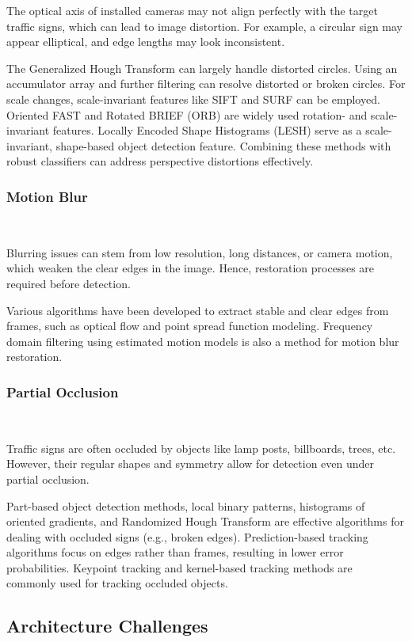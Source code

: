\documentclass[letterpaper, 10 pt, conference]{ieeeconf}
\begin{document}
The optical axis of installed cameras may not align perfectly with the target traffic signs, which can lead to image distortion. For example, a circular sign may appear elliptical, and edge lengths may look inconsistent.

The Generalized Hough Transform can largely handle distorted circles. Using an accumulator array and further filtering can resolve distorted or broken circles. For scale changes, scale-invariant features like SIFT and SURF can be employed. Oriented FAST and Rotated BRIEF (ORB) are widely used rotation- and scale-invariant features. Locally Encoded Shape Histograms (LESH) serve as a scale-invariant, shape-based object detection feature. Combining these methods with robust classifiers can address perspective distortions effectively.

\subsubsection{Motion Blur}\

Blurring issues can stem from low resolution, long distances, or camera motion, which weaken the clear edges in the image. Hence, restoration processes are required before detection.

Various algorithms have been developed to extract stable and clear edges from frames, such as optical flow and point spread function modeling. Frequency domain filtering using estimated motion models is also a method for motion blur restoration.

\subsubsection{Partial Occlusion}\

Traffic signs are often occluded by objects like lamp posts, billboards, trees, etc. However, their regular shapes and symmetry allow for detection even under partial occlusion.

Part-based object detection methods, local binary patterns, histograms of oriented gradients, and Randomized Hough Transform are effective algorithms for dealing with occluded signs (e.g., broken edges). Prediction-based tracking algorithms focus on edges rather than frames, resulting in lower error probabilities. Keypoint tracking and kernel-based tracking methods are commonly used for tracking occluded objects.

\subsection{Architecture Challenges}
\end{document}
